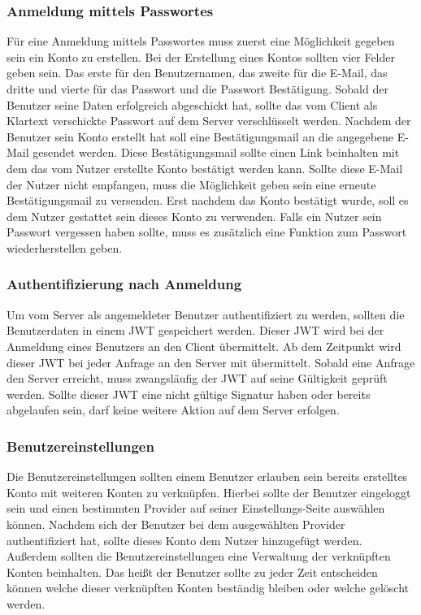 \documentclass[paper=a4,fontsize=12pt,parskip=half]{scrartcl}
\begin{document}
	\subsubsection{Anmeldung mittels Passwortes}
	Für eine Anmeldung mittels Passwortes muss zuerst eine Möglichkeit gegeben sein ein Konto zu erstellen. Bei der Erstellung eines Kontos sollten vier Felder geben sein. Das erste für den Benutzernamen, das zweite für die E-Mail, das dritte und vierte für das Passwort und die Passwort Bestätigung. Sobald der Benutzer seine Daten erfolgreich abgeschickt hat, sollte das vom Client als Klartext verschickte Passwort auf dem Server verschlüsselt werden. Nachdem der Benutzer sein Konto erstellt hat soll eine Bestätigungsmail an die angegebene E-Mail gesendet werden. Diese Bestätigungsmail sollte einen Link beinhalten mit dem das vom Nutzer erstellte Konto bestätigt werden kann. Sollte diese E-Mail der Nutzer nicht empfangen, muss die Möglichkeit geben sein eine erneute Bestätigungsmail zu versenden. Erst nachdem das Konto bestätigt wurde, soll es dem Nutzer gestattet sein dieses Konto zu verwenden. Falls ein Nutzer sein Passwort vergessen haben sollte, muss es zusätzlich eine Funktion zum Passwort wiederherstellen geben.

	\subsubsection{Authentifizierung nach Anmeldung}
	Um vom Server als angemeldeter Benutzer authentifiziert zu werden, sollten die Benutzerdaten in einem \gls{JWT} gespeichert werden. Dieser \gls{JWT} wird bei der Anmeldung eines Benutzers an den Client übermittelt. Ab dem Zeitpunkt wird dieser \gls{JWT} bei jeder Anfrage an den Server mit übermittelt. Sobald eine Anfrage den Server erreicht, muss zwangsläufig der \gls{JWT} auf seine Gültigkeit geprüft werden. Sollte dieser \gls{JWT} eine nicht gültige Signatur haben oder bereits abgelaufen sein, darf keine weitere Aktion auf dem Server erfolgen.

	\subsubsection{Benutzereinstellungen}
	Die Benutzereinstellungen sollten einem Benutzer erlauben sein bereits erstelltes Konto mit weiteren Konten zu verknüpfen. Hierbei sollte der Benutzer eingeloggt sein und einen bestimmten Provider auf seiner Einstellungs-Seite auswählen können. Nachdem sich der Benutzer bei dem ausgewählten Provider authentifiziert hat, sollte dieses Konto dem Nutzer hinzugefügt werden.  Außerdem sollten die Benutzereinstellungen eine Verwaltung der verknüpften Konten beinhalten. Das heißt der Benutzer sollte zu jeder Zeit entscheiden können welche dieser verknüpften Konten beständig bleiben oder welche gelöscht werden.
\end{document}
